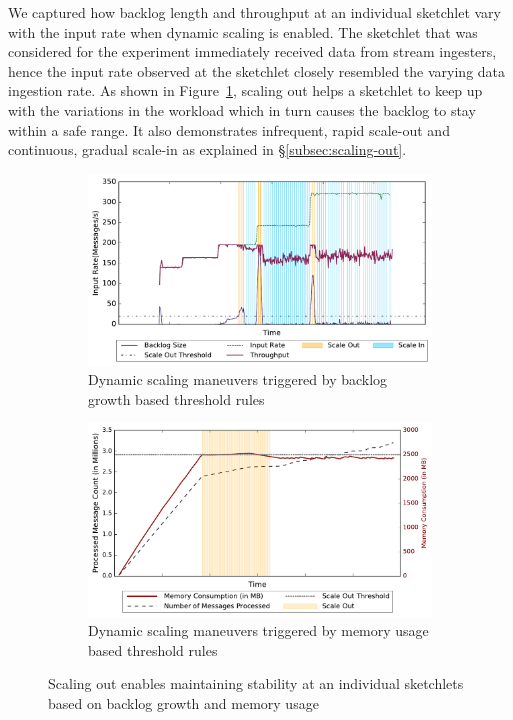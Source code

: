 We captured how backlog length and throughput at an individual sketchlet vary with the input rate when dynamic scaling is enabled.
The sketchlet that was considered for the experiment immediately received data from stream ingesters, hence the input rate observed at the sketchlet closely resembled the varying data ingestion rate.
As shown in Figure~\ref{fig:stability-backlog}, scaling out helps a sketchlet to keep up with the variations in the workload which in turn causes the backlog to stay within a safe range.
It also demonstrates infrequent, rapid scale-out and continuous, gradual scale-in as explained in \S\ref{subsec:scaling-out}.
\begin{figure}[h!]
    \begin{subfigure}{0.48\textwidth}
            \centering
            \includegraphics[scale=0.42]{figures/stability_partial.pdf}
            \caption{Dynamic scaling maneuvers triggered by backlog growth based threshold rules}
            \label{fig:stability-backlog}
    \end{subfigure}
    \begin{subfigure}{0.48\textwidth}
            \centering
            \includegraphics[scale=0.42]{figures//mem_stability.pdf} 
            \caption{Dynamic scaling maneuvers triggered by memory usage based threshold rules}
            \label{fig:stability-mem}
    \end{subfigure}
    \caption{Scaling out enables maintaining stability at an individual sketchlets based on backlog growth and memory usage}
    \label{fig:system-stability}
\end{figure}
